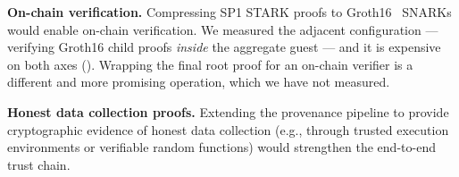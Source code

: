 \textbf{On-chain verification.} Compressing SP1 STARK proofs to
Groth16~\cite{groth2016zksnark} SNARKs would enable on-chain verification.
We measured the adjacent configuration --- verifying Groth16 child proofs
\emph{inside} the aggregate guest --- and it is expensive on both axes
(). Wrapping the final root proof for an on-chain verifier
is a different and more promising operation, which we have not measured.

\textbf{Honest data collection proofs.} Extending the provenance pipeline to
provide cryptographic evidence of honest data collection (e.g., through
trusted execution environments or verifiable random functions) would
strengthen the end-to-end trust chain.
